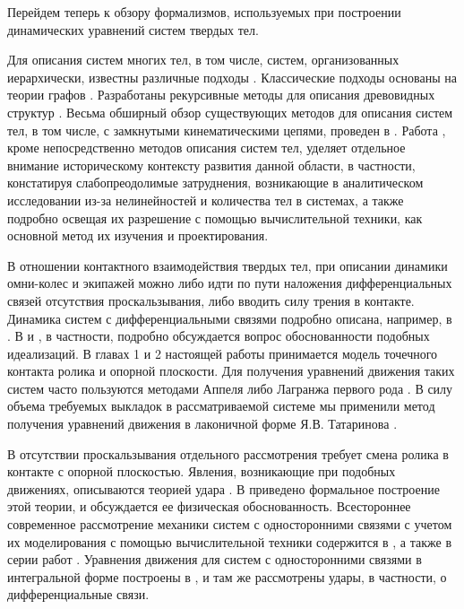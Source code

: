 Перейдем теперь к обзору формализмов, используемых при построении динамических уравнений систем твердых тел. 

Для описания систем многих тел, в том числе, систем, организованных иерархически, известны различные подходы \cite{Wittenburg2008,EberhardSchiehlen,Jain2011,Roberson1988,Jerkovsky1977}. Классические подходы основаны на теории графов \cite{Wittenburg2008,Jerkovsky1977}. Разработаны рекурсивные методы для описания древовидных структур \cite{EberhardSchiehlen}. Весьма обширный обзор существующих методов для описания систем тел, в том числе, с замкнутыми кинематическими цепями, проведен в \cite{Jain2011}. Работа \cite{Roberson1988}, кроме непосредственно методов описания систем тел, уделяет отдельное внимание историческому контексту развития данной области, в частности, констатируя слабопреодолимые затруднения, возникающие в аналитическом исследовании из-за нелинейностей и количества тел в системах, а также подробно освещая их разрешение с помощью вычислительной техники, как основной метод их изучения и проектирования.

В отношении контактного взаимодействия твердых тел, при описании динамики омни-колес и экипажей можно либо идти по пути наложения дифференциальных связей отсутствия проскальзывания, либо вводить силу трения в контакте. Динамика систем с дифференциальными связями подробно описана, например, в \cite{Chaplygin1949,NejmarkFufaev1967}. В \cite{NejmarkFufaev1967} и \cite{karapetyan1981negolonom}, в частности, подробно обсуждается вопрос обоснованности подобных идеализаций. В главах 1 и 2 настоящей работы принимается модель точечного контакта ролика и опорной плоскости. Для получения уравнений движения таких систем часто пользуются методами Аппеля либо Лагранжа первого рода \cite{KarapetyanKugushev2010,Appel1,AppelTwo1960}. В силу объема требуемых выкладок в рассматриваемой системе мы применили метод получения уравнений движения в лаконичной форме Я.В. Татаринова \cite{Tatarinov,Tatarinov2005}.

В отсутствии проскальзывания отдельного рассмотрения требует смена ролика в контакте с опорной плоскостью. Явления, возникающие при подобных движениях, описываются теорией удара \cite{AppelTwo1960,Vilke,KozlovTreshevBilliardsBook1991}. В \cite{KozlovTreshevBilliardsBook1991} приведено формальное построение этой теории, и обсуждается ее физическая обоснованность. Всестороннее современное рассмотрение механики систем с односторонними связями с учетом их моделирования с помощью вычислительной техники содержится в \cite{BrogliatoBook1999}, а также в серии работ \cite{PfeifferGlockerBook,PfeifferGlocker1995,Pfeiffer1999a,PfeifferGlockerSymposium1999,Pfeiffer1997,Glocker1999,Pfeiffer2001,Brogliato2002,Pfeiffer2003,FloresGlocker2011,Zbiciak2014}. Уравнения движения для систем с односторонними связями в интегральной форме построены в \cite{Kugushev2003}, и там же рассмотрены удары, в частности, о дифференциальные связи.

